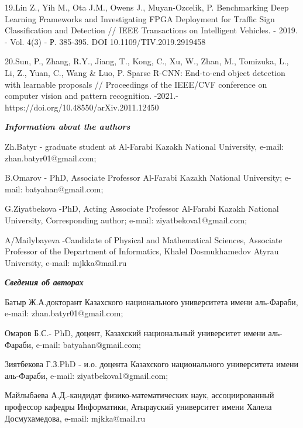 19.Lin Z., Yih M., Ota J.M., Owens J., Muyan-Ozcelik, P. Benchmarking
Deep Learning Frameworks and Investigating FPGA Deployment for Traffic
Sign Classification and Detection // IEEE Transactions on Intelligent
Vehicles. - 2019. - Vol. 4(3) - Р. 385-395. DOI 10.1109/TIV.2019.2919458

20.Sun, P., Zhang, R.Y., Jiang, T., Kong, C., Xu, W., Zhan, M.,
Tomizuka, L., Li, Z., Yuan, C., Wang \& Luo, P. Sparse R-CNN: End-to-end
object detection with learnable proposals // Proceedings of the IEEE/CVF
conference on computer vision and pattern recognition. -2021.-
https://doi.org/10.48550/arXiv.2011.12450

\emph{{\bfseries Information about the authors}}

Zh.Batyr - graduate student at Al-Farabi Kazakh National University,
e-mail: zhan.batyr01@gmail.com;

B.Omarov - PhD, Associate Professor Al-Farabi Kazakh National
University; e-mail: batyahan@gmail.com;

G.Ziyatbekova -PhD, Acting Associate Professor Al-Farabi Kazakh National
University, Corresponding author; e-mail: ziyatbekova1@gmail.com;

A/Mailybayeva -Candidate of Physical and Mathematical Sciences,
Associate Professor of the Department of Informatics, Khalel
Dosmukhamedov Atyrau University, e-mail: mjkka@mail.ru

\emph{{\bfseries Сведения об авторах}}

Батыр Ж.А.докторант Казахского национального университета имени
аль-Фараби, e-mail: zhan.batyr01@gmail.com;

Омаров Б.С.- PhD, доцент, Казахский национальный университет имени
аль-Фараби, e-mail: batyahan@gmail.com;

Зиятбекова Г.З.PhD - и.о. доцента Казахского национального университета
имени аль-Фараби, e-mail: ziyatbekova1@gmail.com;

Майлыбаева А.Д.-кандидат физико-математических наук, ассоциированный
профессор кафедры Информатики, Атырауский университет имени Халела
Досмухамедова, e-mail: mjkka@mail.ru
